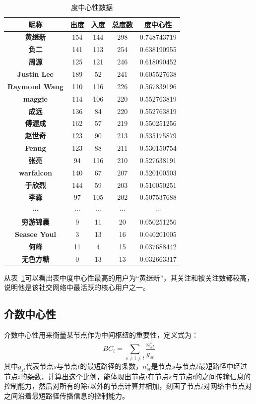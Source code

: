 \documentclass[a4paper]{article}
\begin{document}
\begin{spacing}{1.5}
\begin{table}[htbp]
  \centering
  \caption{度中心性数据}
    \begin{tabular}{ccccc}
    \toprule
    \textbf{昵称} & 出度    & 入度    & 总度数   & 度中心性 \\
    \midrule
    \textbf{黄继新} & 154   & 144   & 298   & 0.748743719 \\
    \textbf{负二} & 141   & 113   & 254   & 0.638190955 \\
    \textbf{周源} & 125   & 121   & 246   & 0.618090452 \\
    \textbf{Justin Lee} & 189   & 52    & 241   & 0.605527638 \\
    \textbf{Raymond Wang} & 110   & 116   & 226   & 0.567839196 \\
    \textbf{maggie} & 114   & 106   & 220   & 0.552763819 \\
    \textbf{成远} & 136   & 84    & 220   & 0.552763819 \\
    \textbf{傅渥成} & 162   & 57    & 219   & 0.550251256 \\
    \textbf{赵世奇} & 123   & 90    & 213   & 0.535175879 \\
    \textbf{Fenng} & 123   & 88    & 211   & 0.530150754 \\
    \textbf{张亮} & 94    & 116   & 210   & 0.527638191 \\
    \textbf{warfalcon} & 140   & 67    & 207   & 0.520100503 \\
    \textbf{于欣烈} & 144   & 59    & 203   & 0.510050251 \\
    \textbf{李淼} & 97    & 105   & 202   & 0.507537688 \\
    $\cdots$ & $\cdots$    & $\cdots$   & $\cdots$   & $\cdots$ \\
    \textbf{穷游锦囊} & 9     & 11    & 20    & 0.050251256 \\
    \textbf{Seasee Youl} & 3     & 13    & 16    & 0.040201005 \\
    \textbf{何峰} & 11    & 4     & 15    & 0.037688442 \\
    \textbf{无色方糖} & 0     & 13    & 13    & 0.032663317 \\
    \bottomrule
    \end{tabular}%
  \label{tab1}%
\end{table}%

从表~\ref{tab1}可以看出表中度中心性最高的用户为“黄继新”，其关注和被关注数都较高，说明他是该社交网络中最活跃的核心用户之一。

\subsection{介数中心性}
介数中心性用来衡量某节点作为中间枢纽的重要性，定义式为：
\[B{C_i} = \sum\limits_{s \ne i \ne t} {\frac{{n_{st}^i}}{{{g_{st}}}}} \]
其中$g_{st}$代表节点$s$与节点$t$的最短路径的条数，$n_{st}^i$是节点$s$与节点$t$最短路径中经过节点$i$的条数，计算出这个比例，能体现出节点$i$在节点$s$与节点$t$的之间传输信息的控制能力，然后对所有的除$i$以外的节点计算并相加，刻画了节点$i$对网络中节点对之间沿着最短路径传播信息的控制能力。


\end{spacing}
\end{document}
